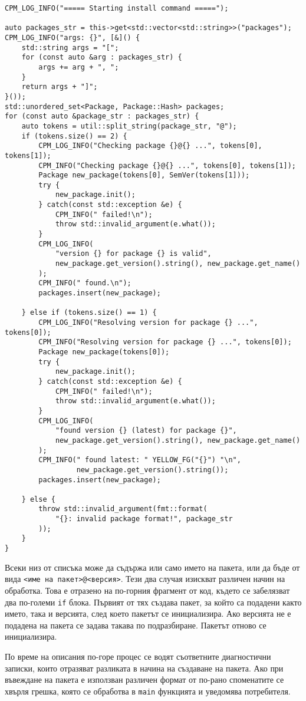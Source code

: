 \begin{lstlisting}[style=cpp,
				   caption=Сдобиване с пакетите за инсталиране,
				   label={lst:install-get}]
CPM_LOG_INFO("===== Starting install command =====");

auto packages_str = this->get<std::vector<std::string>>("packages");
CPM_LOG_INFO("args: {}", [&]() {
	std::string args = "[";
	for (const auto &arg : packages_str) {
		args += arg + ", ";
	}
	return args + "]";
}());
std::unordered_set<Package, Package::Hash> packages;
for (const auto &package_str : packages_str) {
	auto tokens = util::split_string(package_str, "@");
	if (tokens.size() == 2) {
		CPM_LOG_INFO("Checking package {}@{} ...", tokens[0], tokens[1]);
		CPM_INFO("Checking package {}@{} ...", tokens[0], tokens[1]);
		Package new_package(tokens[0], SemVer(tokens[1]));
		try {
			new_package.init();
		} catch(const std::exception &e) {
			CPM_INFO(" failed!\n");
			throw std::invalid_argument(e.what());
		}
		CPM_LOG_INFO(
			"version {} for package {} is valid",
			new_package.get_version().string(), new_package.get_name()
		);
		CPM_INFO(" found.\n");
		packages.insert(new_package);

	} else if (tokens.size() == 1) {
		CPM_LOG_INFO("Resolving version for package {} ...", tokens[0]);
		CPM_INFO("Resolving version for package {} ...", tokens[0]);
		Package new_package(tokens[0]);
		try {
			new_package.init();
		} catch(const std::exception &e) {
			CPM_INFO(" failed!\n");
			throw std::invalid_argument(e.what());
		}
		CPM_LOG_INFO(
			"found version {} (latest) for package {}",
			new_package.get_version().string(), new_package.get_name()
		);
		CPM_INFO(" found latest: " YELLOW_FG("{}") "\n",
				 new_package.get_version().string());
		packages.insert(new_package);

	} else {
		throw std::invalid_argument(fmt::format(
			"{}: invalid package format!", package_str
		));
	}
}
\end{lstlisting}

Всеки низ от списъка може да съдържа или само името на пакета, или да бъде от
вида \texttt{<име на пакет>@<версия>}. Тези два случая изискват различен начин
на обработка. Това е отразено на по-горния фрагмент от код, където се забелязват
два по-големи \texttt{if} блока. Първият от тях създава пакет, за който са
подадени както името, така и версията, след което пакетът се инициализира. Ако
версията не е подадена на пакета се задава такава по подразбиране. Пакетът
отново се инициализира.

По време на описания по-горе процес се водят съответните диагностични записки,
които отразяват разликата в начина на създаване на пакета. Ако при въвеждане на
пакета е използван различен формат от по-рано споменатите се хвърля грешка,
която се обработва в \texttt{main} функцията и уведомява потребителя.


